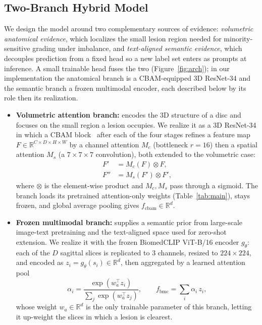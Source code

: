 \documentclass[runningheads]{llncs}
\begin{document}
\subsection{Two-Branch Hybrid Model}\label{wf}

We design the model around two complementary sources of evidence: \emph{volumetric anatomical evidence}, which localizes the small lesion region needed for minority-sensitive grading under imbalance, and \emph{text-aligned semantic evidence}, which decouples prediction from a fixed head so a new label set enters as prompts at inference. A small trainable head fuses the two (Figure~\ref{fig:arch}); in our implementation the anatomical branch is a CBAM-equipped 3D ResNet-34 and the semantic branch a frozen multimodal encoder, each described below by its role then its realization.
\begin{itemize}
\item \textbf{Volumetric attention branch:} encodes the 3D structure of a disc and focuses on the small region a lesion occupies. We realize it as a 3D ResNet-34 in which a CBAM block~\cite{woo2018cbam} after each of the four stages refines a feature map $F \in \mathbb{R}^{C \times D \times H \times W}$ by a channel attention $M_c$ (bottleneck $r=16$) then a spatial attention $M_s$ (a $7\!\times\!7\!\times\!7$ convolution), both extended to the volumetric case:
\begin{align}
F' &= M_c(F) \otimes F, \label{eq:cbam_c}\\
F'' &= M_s(F') \otimes F', \label{eq:cbam_s}
\end{align}
where $\otimes$ is the element-wise product and $M_c, M_s$ pass through a sigmoid. The branch loads its pretrained attention-only weights (Table~\ref{tab:main}), stays frozen, and global average pooling gives $f_{\text{cbam}} \in \mathbb{R}^{d}$.

\item \textbf{Frozen multimodal branch:} supplies a semantic prior from large-scale image-text pretraining and the text-aligned space used for zero-shot extension. We realize it with the frozen BiomedCLIP ViT-B/16 encoder $g_\theta$: each of the $D$ sagittal slices is replicated to 3 channels, resized to $224\times224$, and encoded as $z_i = g_\theta(s_i) \in \mathbb{R}^{d}$, then aggregated by a learned attention pool
\begin{equation}
\alpha_i = \frac{\exp(w_a^\top z_i)}{\sum_{j} \exp(w_a^\top z_j)},
\qquad
f_{\text{bmc}} = \sum_{i} \alpha_i \, z_i,
\label{eq:slicepool}
\end{equation}
whose weight $w_a \in \mathbb{R}^{d}$ is the only trainable parameter of this branch, letting it up-weight the slices in which a lesion is clearest.


\end{itemize}
\end{document}
